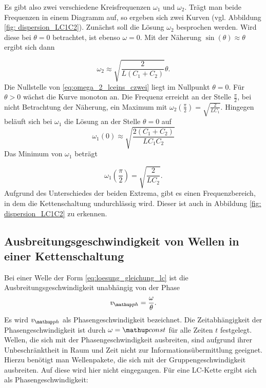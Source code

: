 Es gibt also zwei verschiedene Kreisfrequenzen $\omega_1$ und $\omega_2$.
Trägt man beide Frequenzen in einem Diagramm auf, so ergeben sich %
zwei Kurven (vgl. Abbildung \ref{fig: dispersion_LC1C2}).
Zunächst soll die Lösung $\omega_2$ besprochen werden.
Wird diese bei $\theta=0$ betrachtet, ist ebenso $\omega=0$.
Mit der Näherung $\sin(\theta)\approx\theta$ ergibt sich dann

\begin{equation}
\label{eq:omega_2_lceins_czwei}
\omega_2\approx\sqrt{\frac{2}{L\left(C_1+C_2\right)}}\theta.
\end{equation}
Die Nullstelle von \eqref{eq:omega_2_lceins_czwei} liegt im Nullpunkt $\theta=0$.
Für $\theta>0$ wächst die Kurve monoton an.
Die Frequenz erreicht an der Stelle $\frac{\pi}{2}$, bei nicht Betrachtung der Näherung,
ein Maximum mit $\omega_2(\frac{\pi}{2})=\sqrt{\frac{2}{LC_1}}$.
 \newline
Hingegen beläuft sich bei $\omega_1$ die Lösung an der Stelle $\theta=0$ auf
\begin{equation}
\omega_1(0)\approx\sqrt{\frac{2(C_1+C_2)}{LC_1C_2}}
\label{eq: obere_grenfrequenz}
\end{equation}
Das Minimum von $\omega_1$ beträgt

\begin{equation}
\label{eq:max_omega_1_ceins_czwei}
\omega_1(\frac{\pi}{2})=\sqrt{\frac{2}{LC_2}}.
\end{equation}
Aufgrund des Unterschiedes der beiden Extrema, gibt es einen Frequenzbereich, in dem %
die Kettenschaltung undurchlässig wird. Dieser ist auch in Abbildung \ref{fig: dispersion_LC1C2} %
zu erkennen.

\subsection{Ausbreitungsgeschwindigkeit von Wellen in einer Kettenschaltung}
Bei einer Welle der Form \eqref{eq:loesung_gleichung_lc} %
ist die Ausbreitungsgeschwindigkeit unabhängig von der Phase %
\begin{equation*}
v\ua{ph}=\frac{\omega}{\theta}.
\end{equation*}
Es wird $v\ua{ph}$ als Phasengeschwindigkeit bezeichnet.
Die Zeitabhängigkeit der Phasengeschwindigkeit ist durch $\omega=\map{const}$
für alle Zeiten $t$ festgelegt. Wellen, die sich mit der Phasengeschwindigkeit
ausbreiten, sind aufgrund ihrer Unbeschränktheit in Raum und Zeit nicht zur %
Informationsübermittlung geeignet. Hierzu benötigt man Wellenpakete, die sich
mit der Gruppengeschwindigkeit ausbreiten. Auf diese wird hier nicht eingegangen. %
Für eine LC-Kette ergibt sich als Phasengeschwindigkeit:

